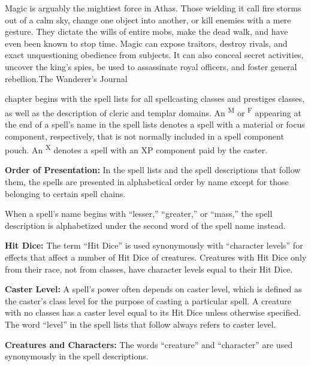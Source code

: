 {Magic is arguably the mightiest force in Athas. Those wielding it call fire storms out of a calm sky, change one object into another, or kill enemies with a mere gesture. They dictate the wills of entire mobs, make the dead walk, and have even been known to stop time. Magic can expose traitors, destroy rivals, and exact unquestioning obedience from subjects. It can also conceal secret activities, uncover the king's spies, be used to assassinate royal officers, and foster general rebellion.}{The Wanderer's Journal}

 chapter begins with the spell lists for all spellcasting classes and prestiges classes, as well as the description of cleric and templar domains. An \textsuperscript{M} or \textsuperscript{F} appearing at the end of a spell's name in the spell lists denotes a spell with a material or focus component, respectively, that is not normally included in a spell component pouch. An \textsuperscript{X} denotes a spell with an XP component paid by the caster.

\textbf{Order of Presentation:} In the spell lists and the spell descriptions that follow them, the spells are presented in alphabetical order by name except for those belonging to certain spell chains.

When a spell's name begins with ``lesser,'' ``greater,'' or ``mass,'' the spell description is alphabetized under the second word of the spell name instead.

\textbf{Hit Dice:} The term ``Hit Dice'' is used synonymously with ``character levels'' for effects that affect a number of Hit Dice of creatures. Creatures with Hit Dice only from their race, not from classes, have character levels equal to their Hit Dice.

\textbf{Caster Level:} A spell's power often depends on caster level, which is defined as the caster's class level for the purpose of casting a particular spell. A creature with no classes has a caster level equal to its Hit Dice unless otherwise specified. The word ``level'' in the spell lists that follow always refers to caster level.

\textbf{Creatures and Characters:} The words ``creature'' and ``character'' are used synonymously in the spell descriptions.










